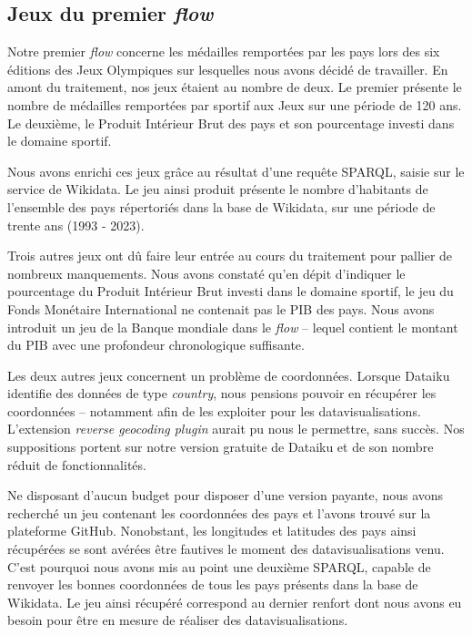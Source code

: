 \documentclass[hidelinks, 12pt]{article}
\begin{document}
\subsection{Jeux du premier \textit{flow}}

Notre premier \textit{flow} concerne les médailles remportées par les pays lors des six éditions des Jeux Olympiques sur lesquelles nous avons décidé de travailler. En amont du traitement, nos jeux étaient au nombre de deux. Le premier présente le nombre de médailles remportées par sportif aux Jeux sur une période de 120 ans\autocite{kaggle}. Le deuxième, le Produit Intérieur Brut des pays et son pourcentage investi dans le domaine sportif\autocite{fmi}.

Nous avons enrichi ces jeux grâce au résultat d'une requête SPARQL, saisie sur le service de Wikidata. Le jeu ainsi produit présente le nombre d'habitants de l'ensemble des pays répertoriés dans la base de Wikidata, sur une période de trente ans (1993 - 2023)\autocite{wikiquerypop}.

Trois autres jeux ont dû faire leur entrée au cours du traitement pour pallier de nombreux manquements. Nous avons constaté qu'en dépit d'indiquer le pourcentage du Produit Intérieur Brut investi dans le domaine sportif, le jeu du Fonds Monétaire International ne contenait pas le PIB des pays. Nous avons introduit un jeu de la Banque mondiale\autocite{worldbank} dans le \textit{flow} -- lequel contient le montant du PIB avec une profondeur chronologique suffisante.

Les deux autres jeux concernent un problème de coordonnées. Lorsque Dataiku identifie des données de type \textit{country}, nous pensions pouvoir en récupérer les coordonnées -- notamment afin de les exploiter pour les datavisualisations. L'extension \textit{reverse geocoding plugin} aurait pu nous le permettre, sans succès. Nos suppositions portent sur notre version gratuite de Dataiku et de son nombre réduit de fonctionnalités.

Ne disposant d'aucun budget pour disposer d'une version payante, nous avons recherché un jeu contenant les coordonnées des pays et l'avons trouvé sur la plateforme GitHub\autocite{github}. Nonobstant, les longitudes et latitudes des pays ainsi récupérées se sont avérées être fautives le moment des datavisualisations venu. C'est pourquoi nous avons mis au point une deuxième SPARQL, capable de renvoyer les bonnes coordonnées de tous les pays présents dans la base de Wikidata. Le jeu ainsi récupéré correspond au dernier renfort dont nous avons eu besoin pour être en mesure de réaliser des datavisualisations.
\end{document}
